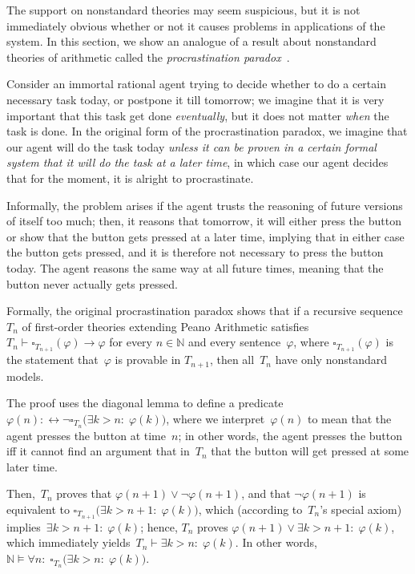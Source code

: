 \documentclass[12pt]{article}
\newcommand{\vp}{\varphi}
\newcommand{\NN}{\mathbb{N}}
\theoremstyle{plain}
\theoremstyle{definition}
\theoremstyle{remark}
\begin{document}
The support on nonstandard theories may seem suspicious, but it is not immediately obvious whether or not it causes problems in applications of the system. In this section, we show an analogue of a result about nonstandard theories of arithmetic called the \emph{procrastination paradox}~\cite{yudkowsky13}. 

Consider an immortal rational agent trying to decide whether to do a certain necessary task today, or postpone it till tomorrow; we imagine that it is very important that this task get done \emph{eventually}, but it does not matter \emph{when} the task is done. In the original form of the procrastination paradox, we imagine that our agent will do the task today \emph{unless it can be proven in a certain formal system that it will do the task at a later time}, in which case our agent decides that for the moment, it is alright to procrastinate.

Informally, the problem arises if the agent trusts the reasoning of future versions of itself too much; then, it reasons that tomorrow, it will either press the button or show that the button gets pressed at a later time, implying that in either case the button gets pressed, and it is therefore not necessary to press the button today. The agent reasons the same way at all future times, meaning that the button never actually gets pressed.

Formally, the original procrastination paradox shows that if a recursive sequence~$T_n$ of first-order theories extending Peano Arithmetic satisfies $T_n \vdash \square_{T_{n+1}}(\vp)\to\vp$ for every $n\in\NN$ and every sentence~$\vp$, where $\square_{T_{n+1}}(\vp)$ is the statement that~$\vp$ is provable in $T_{n+1}$, then all~$T_n$ have only nonstandard models.

The proof uses the diagonal lemma to define a predicate~$\vp(n) :\leftrightarrow \neg\square_{T_n}\big(\exists k>n{:}\;\vp(k)\big)$, where we interpret~$\vp(n)$ to mean that the agent presses the button at time~$n$; in other words, the agent presses the button iff it cannot find an argument that in~$T_n$ that the button will get pressed at some later time.

Then,~$T_n$ proves that $\vp(n+1)\vee\neg\vp(n+1)$, and that $\neg\vp(n+1)$ is equivalent to $\square_{T_{n+1}}\big(\exists k>n+1{:}\;\vp(k)\big)$, which (according to~$T_n$'s special axiom) implies~$\exists k>n+1{:}\;\vp(k)$; hence, $T_n$ proves $\vp(n+1)\vee\exists k>n+1{:}\;\vp(k)$, which immediately yields~$T_n\vdash\exists k>n{:}\;\vp(k)$. In other words, $\NN\vDash\forall n{:}\;\square_{T_n}\big(\exists k>n{:}\;\vp(k)\big)$. 
\end{document}
